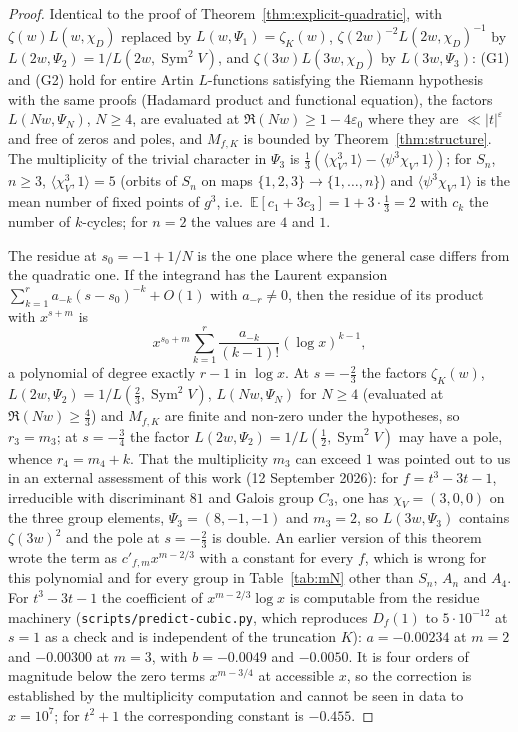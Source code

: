 \documentclass[11pt,a4paper]{article}
\theoremstyle{remark}\newtheorem{remark}[theorem]{Remark}
\newcommand{\Sym}{\operatorname{Sym}}\newcommand{\Res}{\operatorname*{Res}}
\begin{document}
\begin{proof}
Identical to the proof of Theorem~\ref{thm:explicit-quadratic}, with $\zeta(w)L(w,\chi_D)$ replaced by
$L(w,\Psi_1)=\zeta_K(w)$, $\zeta(2w)^{-2}L(2w,\chi_D)^{-1}$ by $L(2w,\Psi_2)=1/L(2w,\Sym^2V)$, and
$\zeta(3w)L(3w,\chi_D)$ by $L(3w,\Psi_3)$: (G1) and (G2) hold for entire Artin $L$-functions satisfying the
Riemann hypothesis with the same proofs (Hadamard product and functional equation), the factors
$L(Nw,\Psi_N)$, $N\ge4$, are evaluated at $\Re(Nw)\ge1-4\varepsilon_0$ where they are $\ll|t|^\varepsilon$ and free of
zeros and poles, and $M_{f,K}$ is bounded by Theorem~\ref{thm:structure}. The multiplicity of the trivial
character in $\Psi_3$ is $\tfrac13(\langle\chi_V^3,1\rangle-\langle\psi^3\chi_V,1\rangle)$; for $S_n$, $n\ge3$,
$\langle\chi_V^3,1\rangle=5$ (orbits of $S_n$ on maps $\{1,2,3\}\to\{1,\dots,n\}$) and $\langle\psi^3\chi_V,1\rangle$ is
the mean number of fixed points of $g^3$, i.e.\ $\mathbb E[c_1+3c_3]=1+3\cdot\tfrac13=2$ with $c_k$ the number of
$k$-cycles; for $n=2$ the values are $4$ and $1$.

The residue at $s_0=-1+1/N$ is the one place where the general case differs from the quadratic one. If the integrand
has the Laurent expansion $\sum_{k=1}^{r}a_{-k}(s-s_0)^{-k}+O(1)$ with $a_{-r}\ne0$, then the residue of its product
with $x^{s+m}$ is
\[
x^{s_0+m}\sum_{k=1}^{r}\frac{a_{-k}}{(k-1)!}(\log x)^{k-1},
\]
a polynomial of degree exactly $r-1$ in $\log x$. At $s=-\tfrac23$ the factors $\zeta_K(w)$, $L(2w,\Psi_2)=1/L(\tfrac23,\Sym^2V)$,
$L(Nw,\Psi_N)$ for $N\ge4$ (evaluated at $\Re(Nw)\ge\tfrac43$) and $M_{f,K}$ are finite and non-zero under the
hypotheses, so $r_3=m_3$; at $s=-\tfrac34$ the factor $L(2w,\Psi_2)=1/L(\tfrac12,\Sym^2V)$ may have a pole, whence
$r_4=m_4+k$. That the multiplicity $m_3$ can exceed $1$ was pointed out to us in an external assessment of this
work (12 September 2026): for $f=t^3-3t-1$, irreducible with discriminant $81$ and Galois group $C_3$, one has
$\chi_V=(3,0,0)$ on the three group elements, $\Psi_3=(8,-1,-1)$ and $m_3=2$, so $L(3w,\Psi_3)$ contains
$\zeta(3w)^2$ and the pole at $s=-\tfrac23$ is double. An earlier version of this theorem wrote the term as
$c'_{f,m}x^{m-2/3}$ with a constant for every $f$, which is wrong for this polynomial and for every group in
Table~\ref{tab:mN} other than $S_n$, $A_n$ and $A_4$. For $t^3-3t-1$ the coefficient of $x^{m-2/3}\log x$ is computable
from the residue machinery (\texttt{scripts/predict-cubic.py}, which reproduces $D_f(1)$ to $5\cdot10^{-12}$ at $s=1$ as a
check and is independent of the truncation $K$): $a=-0.00234$ at $m=2$ and $-0.00300$ at $m=3$, with $b=-0.0049$ and
$-0.0050$. It is four orders of magnitude below the zero terms $x^{m-3/4}$ at accessible $x$, so the correction is
established by the multiplicity computation and cannot be seen in data to $x=10^7$; for $t^2+1$ the corresponding
constant is $-0.455$.
\end{proof}
\end{document}
